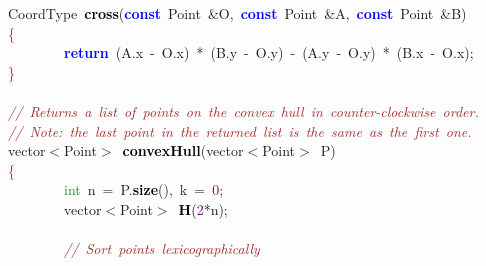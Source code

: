 {{\mbox{}CoordType\ \textbf{\textcolor{Black}{cross}}\textcolor{BrickRed}{(}\textbf{\textcolor{Blue}{const}}\ Point\ \textcolor{BrickRed}{\&}O\textcolor{BrickRed}{,}\ \textbf{\textcolor{Blue}{const}}\ Point\ \textcolor{BrickRed}{\&}A\textcolor{BrickRed}{,}\ \textbf{\textcolor{Blue}{const}}\ Point\ \textcolor{BrickRed}{\&}B\textcolor{BrickRed}{)} \\
\mbox{}\textcolor{Red}{\{} \\
\mbox{}\ \ \ \ \ \ \ \ \textbf{\textcolor{Blue}{return}}\ \textcolor{BrickRed}{(}A\textcolor{BrickRed}{.}x\ \textcolor{BrickRed}{-}\ O\textcolor{BrickRed}{.}x\textcolor{BrickRed}{)}\ \textcolor{BrickRed}{*}\ \textcolor{BrickRed}{(}B\textcolor{BrickRed}{.}y\ \textcolor{BrickRed}{-}\ O\textcolor{BrickRed}{.}y\textcolor{BrickRed}{)}\ \textcolor{BrickRed}{-}\ \textcolor{BrickRed}{(}A\textcolor{BrickRed}{.}y\ \textcolor{BrickRed}{-}\ O\textcolor{BrickRed}{.}y\textcolor{BrickRed}{)}\ \textcolor{BrickRed}{*}\ \textcolor{BrickRed}{(}B\textcolor{BrickRed}{.}x\ \textcolor{BrickRed}{-}\ O\textcolor{BrickRed}{.}x\textcolor{BrickRed}{);} \\
\mbox{}\textcolor{Red}{\}} \\
\mbox{}\  \\
\mbox{}\textit{\textcolor{Brown}{//\ Returns\ a\ list\ of\ points\ on\ the\ convex\ hull\ in\ counter-clockwise\ order.}} \\
\mbox{}\textit{\textcolor{Brown}{//\ Note:\ the\ last\ point\ in\ the\ returned\ list\ is\ the\ same\ as\ the\ first\ one.}} \\
\mbox{}vector\textcolor{BrickRed}{$<$}Point\textcolor{BrickRed}{$>$}\ \textbf{\textcolor{Black}{convexHull}}\textcolor{BrickRed}{(}vector\textcolor{BrickRed}{$<$}Point\textcolor{BrickRed}{$>$}\ P\textcolor{BrickRed}{)} \\
\mbox{}\textcolor{Red}{\{} \\
\mbox{}\ \ \ \ \ \ \ \ \textcolor{ForestGreen}{int}\ n\ \textcolor{BrickRed}{=}\ P\textcolor{BrickRed}{.}\textbf{\textcolor{Black}{size}}\textcolor{BrickRed}{(),}\ k\ \textcolor{BrickRed}{=}\ \textcolor{Purple}{0}\textcolor{BrickRed}{;} \\
\mbox{}\ \ \ \ \ \ \ \ vector\textcolor{BrickRed}{$<$}Point\textcolor{BrickRed}{$>$}\ \textbf{\textcolor{Black}{H}}\textcolor{BrickRed}{(}\textcolor{Purple}{2}\textcolor{BrickRed}{*}n\textcolor{BrickRed}{);} \\
\mbox{}\  \\
\mbox{}\ \ \ \ \ \ \ \ \textit{\textcolor{Brown}{//\ Sort\ points\ lexicographically}} \\
}}
